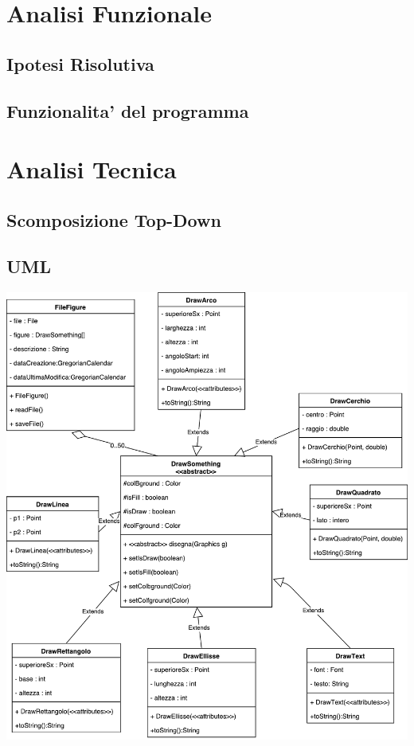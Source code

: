 \documentclass[a4paper,12pt,times,numbered,print,index]{article}
\begin{document}
\section{Analisi Funzionale}


\subsection{Ipotesi Risolutiva}

\subsection{Funzionalita' del programma}


\section{Analisi Tecnica}

\subsection{Scomposizione Top-Down}

\subsection{UML}
\begin{center}
	\includegraphics[scale=0.4]{Immagini/UML.pdf}
\end{center}
\end{document}
